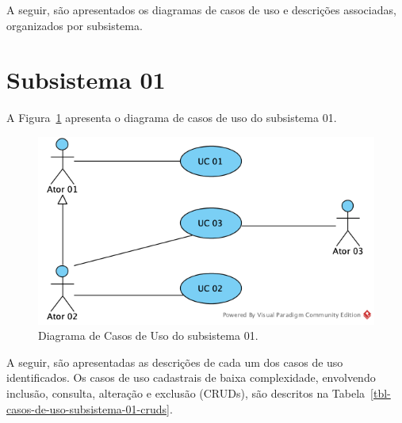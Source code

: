 A seguir, são apresentados os diagramas de casos de uso e descrições associadas, organizados por subsistema.



\section{Subsistema 01}
\label{sec-casos-de-uso-subsistema-01}

A Figura~\ref{fig-casos-de-uso-subsistema-01} apresenta o diagrama de casos de uso do subsistema 01.

\begin{figure}
	\centering
	\includegraphics[width=.7\textwidth]{figuras/fig-casos-de-uso-subsistema-01.png}
	\caption{Diagrama de Casos de Uso do subsistema 01.}
	\label{fig-casos-de-uso-subsistema-01}
\end{figure}

A seguir, são apresentadas as descrições de cada um dos casos de uso identificados. Os casos de uso cadastrais de baixa complexidade, envolvendo inclusão, consulta, alteração e exclusão (CRUDs), são descritos na Tabela~\ref{tbl-casos-de-uso-subsistema-01-cruds}.

